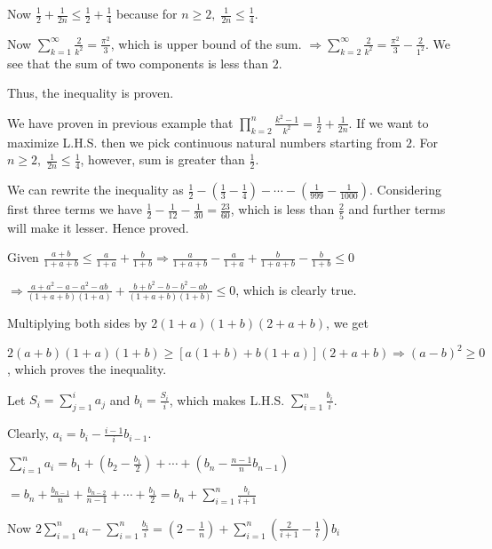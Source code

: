   Now $\frac{1}{2} + \frac{1}{2n}\leq \frac{1}{2} + \frac{1}{4}$ because for $n\geq 2,\;\frac{1}{2n} \leq
  \frac{1}{4}$.

  Now $\displaystyle\sum_{k=1}^{\infty}\frac{2}{k^2} = \frac{\pi^2}{3}$, which is upper bound of the
  sum. $\displaystyle\Rightarrow \sum_{k = 2}^{\infty}\frac{2}{k^2} = \frac{\pi^2}{3} - \frac{2}{1^2}$. We
  see that the sum of two components is less than $2$.

  Thus, the inequality is proven.
\item We have proven in previous example that $\displaystyle\prod_{k = 2}^n\frac{k^2 - 1}{k^2} = \frac{1}{2}
  + \frac{1}{2n}$. If we want to maximize L.H.S. then we pick continuous natural numbers starting from
  $2$. For $n\geq 2,\;\frac{1}{2n} \leq \frac{1}{4}$, however, sum is greater than $\frac{1}{2}$.
\item We can rewrite the inequality as $\frac{1}{2} - \left(\frac{1}{3} - \frac{1}{4}\right) - \cdots -
  \left(\frac{1}{999} - \frac{1}{1000}\right)$. Considering first three terms we have $\frac{1}{2} -
  \frac{1}{12} - \frac{1}{30} = \frac{23}{60}$, which is less than $\frac{2}{5}$ and further terms will make
  it lesser. Hence proved.
\item Given $\frac{a + b}{1 + a + b}\leq \frac{a}{1 + a} + \frac{b}{1 + b} \Rightarrow \frac{a}{1 + a + b} -
  \frac{a}{1 + a} + \frac{b}{1 + a + b} - \frac{b}{1 + b}\leq 0$

  $\Rightarrow \frac{a + a^2 - a - a^2 - ab}{(1 + a + b)(1 + a)} + \frac{b + b^2 - b - b^2 - ab}{(1 + a +
    b)(1 + b)}\leq 0$, which is clearly true.
\item Multiplying both sides by $2(1 + a)(1 + b)(2 + a + b)$, we get

  $2(a + b)(1 + a)(1 + b)\geq [a(1 + b) + b(1 + a)](2 + a + b)\Rightarrow (a - b)^2\geq 0$, which proves the
  inequality.
\item Let $\displaystyle S_i = \sum_{j = 1}^ia_j$ and $b_i = \frac{S_i}{i}$, which makes
  L.H.S. $\displaystyle \sum_{i=1}^n\frac{b_i}{i}$.

  Clearly, $a_i = b_i - \frac{i - 1}{i}b_{i - 1}$.

  $\displaystyle\sum_{i = 1}^na_i = b_1 + \left(b_2 - \frac{b_1}{2}\right) +\cdots + \left(b_n - \frac{n-
    1}{n}b_{n - 1}\right)$

  $= b_n + \frac{b_{n - 1}}{n} + \frac{b_{n - 2}}{n - 1} + \cdots + \frac{b_1}{2} = b_n +
  \displaystyle\sum_{i = 1}^n\frac{b_i}{i + 1}$

  Now $2\displaystyle\sum_{i = 1}^na_i - \sum_{i=1}^n\frac{b_i}{i} = \left(2 - \frac{1}{n}\right) +
  \sum_{i=1}^n\left(\frac{2}{i + 1} - \frac{1}{i}\right)b_i$


